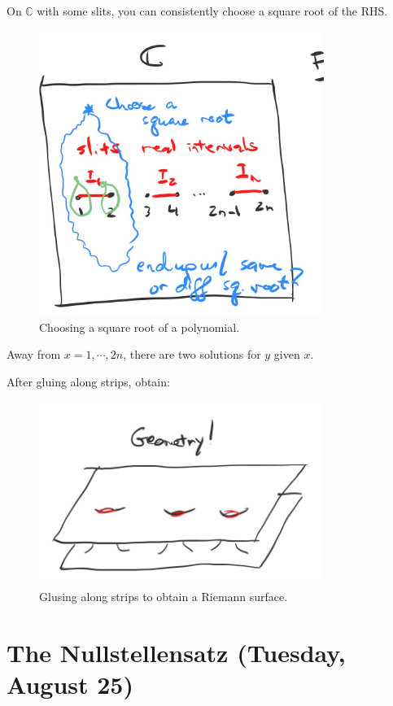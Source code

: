 \begin{fact}

On \({\mathbb{C}}\) with some slits, you can consistently choose a
square root of the RHS.

\begin{figure}
\centering
\includegraphics[width=3.64583in,height=\textheight]{figures/image_2020-08-21-01-31-47.png}
\caption{Choosing a square root of a polynomial.}
\end{figure}

Away from \(x=1, \cdots, 2n\), there are two solutions for \(y\) given
\(x\).

After gluing along strips, obtain:

\begin{figure}
\centering
\includegraphics[width=3.64583in,height=\textheight]{figures/image_2020-08-21-01-32-48.png}
\caption{Glusing along strips to obtain a Riemann surface.}
\end{figure}

\end{fact}

\hypertarget{the-nullstellensatz-tuesday-august-25}{%
\section{The Nullstellensatz (Tuesday, August
25)}\label{the-nullstellensatz-tuesday-august-25}}


